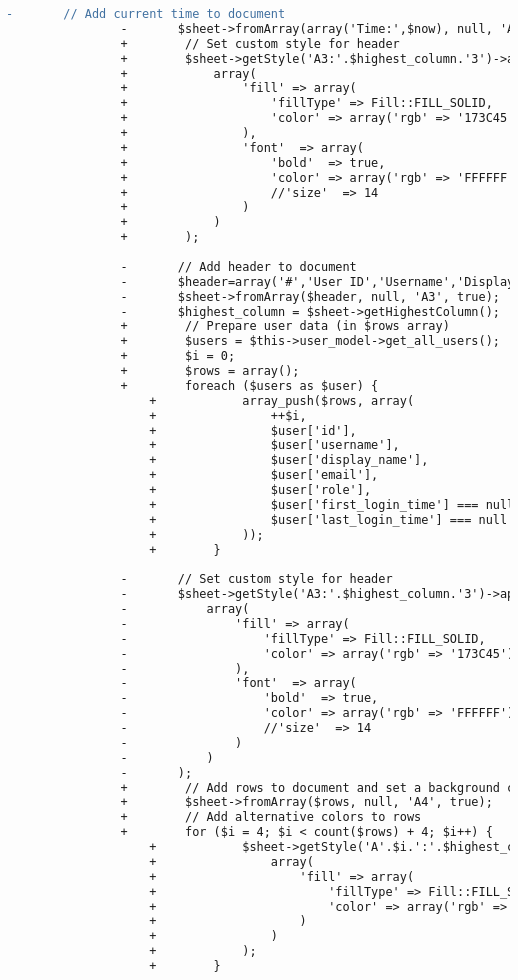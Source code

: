 \begin{lstlisting}[language=diff, caption=Perubahan pada kode Users.php]
				-		// Add current time to document
				-		$sheet->fromArray(array('Time:',$now), null, 'A1', true);
				+        // Set custom style for header
				+        $sheet->getStyle('A3:'.$highest_column.'3')->applyFromArray(
				+            array(
				+                'fill' => array(
				+                    'fillType' => Fill::FILL_SOLID,
				+                    'color' => array('rgb' => '173C45')
				+                ),
				+                'font'  => array(
				+                    'bold'  => true,
				+                    'color' => array('rgb' => 'FFFFFF'),
				+                    //'size'  => 14
				+                )
				+            )
				+        );
				
				-		// Add header to document
				-		$header=array('#','User ID','Username','Display Name','Email','Role','First Login','Last Login');
				-		$sheet->fromArray($header, null, 'A3', true);
				-		$highest_column = $sheet->getHighestColumn();
				+        // Prepare user data (in $rows array)
				+        $users = $this->user_model->get_all_users();
				+        $i = 0;
				+        $rows = array();
				+        foreach ($users as $user) {
					+            array_push($rows, array(
					+                ++$i,
					+                $user['id'],
					+                $user['username'],
					+                $user['display_name'],
					+                $user['email'],
					+                $user['role'],
					+                $user['first_login_time'] === null ? 'Never' : $user['first_login_time'],
					+                $user['last_login_time'] === null ? 'Never' : $user['last_login_time']
					+            ));
					+        }
				
				-		// Set custom style for header
				-		$sheet->getStyle('A3:'.$highest_column.'3')->applyFromArray(
				-			array(
				-				'fill' => array(
				-					'fillType' => Fill::FILL_SOLID,
				-					'color' => array('rgb' => '173C45')
				-				),
				-				'font'  => array(
				-					'bold'  => true,
				-					'color' => array('rgb' => 'FFFFFF'),
				-					//'size'  => 14
				-				)
				-			)
				-		);
				+        // Add rows to document and set a background color of #7BD1BE
				+        $sheet->fromArray($rows, null, 'A4', true);
				+        // Add alternative colors to rows
				+        for ($i = 4; $i < count($rows) + 4; $i++) {
					+            $sheet->getStyle('A'.$i.':'.$highest_column.$i)->applyFromArray(
					+                array(
					+                    'fill' => array(
					+                        'fillType' => Fill::FILL_SOLID,
					+                        'color' => array('rgb' => (($i % 2) ? 'F0F0F0' : 'FAFAFA'))
					+                    )
					+                )
					+            );
					+        }
				

\end{lstlisting}

